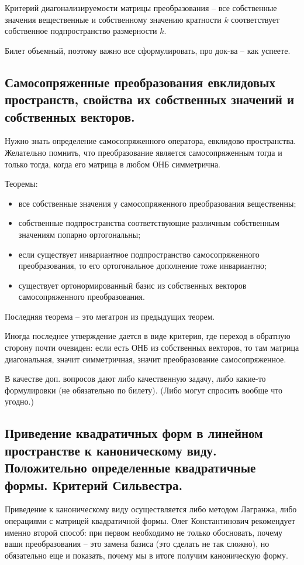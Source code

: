 Критерий диагонализируемости матрицы преобразования -- все собственные значения вещественные и собственному значению кратности $k$ соответствует собственное подпространство размерности $k$.

Билет объемный, поэтому важно все сформулировать, про док-ва -- как успеете.

\subsection{Самосопряженные преобразования евклидовых пространств, свойства их собственных значений и собственных векторов.}

Нужно знать определение самосопряженного оператора, евклидово пространства. Желательно помнить, что преобразование является самосопряженным тогда и только тогда, когда его матрица в любом ОНБ симметрична.

Теоремы:
\begin{itemize}
    \item все собственные значения у самосопряженного преобразования вещественны;
    \item собственные подпространства соответствующие различным собственным значениям попарно ортогональны;
    \item если существует инвариантное подпространство самосопряженного преобразования, то его ортогональное дополнение тоже инвариантно;
    \item существует ортонормированный базис из собственных векторов самосопряженного преобразования.
\end{itemize}

Последняя теорема -- это мегатрон из предыдущих теорем.

Иногда последнее утверждение дается в виде критерия, где переход в обратную сторону почти очевиден: если есть ОНБ из собственных векторов, то там матрица диагональная, значит симметричная, значит преобразование самосопряженное.

В качестве доп. вопросов дают либо качественную задачу, либо какие-то формулировки (не обязательно по билету). (Либо могут спросить вообще что угодно.)

\subsection{Приведение квадратичных форм в линейном пространстве к каноническому виду. Положительно определенные квадратичные формы. Критерий Сильвестра.}

Приведение к каноническому виду осуществляется либо методом Лагранжа, либо операциями с матрицей квадратичной формы. Олег Константинович рекомендует именно второй способ: при первом необходимо не только обосновать, почему ваши преобразования -- это замена базиса (это сделать не так сложно), но обязательно еще и показать, почему мы в итоге получим каноническую форму.

